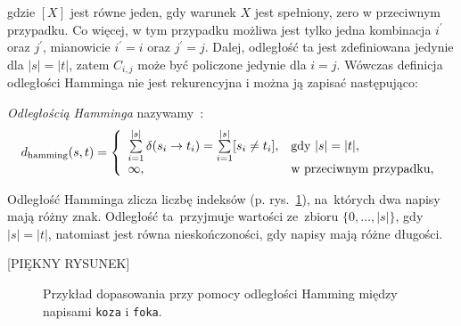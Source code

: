 \documentclass{praca1}
\begin{document}
gdzie $[X]$ jest równe jeden, gdy warunek $X$ jest spełniony, zero w przeciwnym przypadku. Co więcej, w tym przypadku możliwa jest tylko jedna kombinacja $i^\prime$ oraz $j^\prime$, mianowicie $i^\prime = i$ oraz $j^\prime = j$. Dalej, odległość ta jest zdefiniowana jedynie dla $|s| = |t|$, zatem $C_{i,j}$ może być policzone jedynie dla $i = j$. Wówczas definicja odległości Hamminga nie jest rekurencyjna i można ją zapisać następująco:


\begin{definition}
\emph{Odległością Hamminga} nazywamy~\cite{Hamming1950:errordetecting}:
$$
d_{\mathrm{hamming}}(s, t) = \left\{
\begin{array}{l l}     
    \sum\limits_{i=1}^{|s|}\delta(s_i \rightarrow t_i) = \sum\limits_{i=1}^{|s|}[s_i\neq t_i], & \text{gdy } |s| = |t|,\\
    \infty, & \text{w przeciwnym przypadku},
\end{array}\right.
$$
\end{definition}

Odległość Hamminga zlicza liczbę indeksów (p. rys.~\ref{rys:002}), na~których dwa napisy mają różny znak. Odległość ta~przyjmuje wartości ze~zbioru $\{0,\ldots,|s|\}$, gdy $|s|=|t|$, natomiast jest równa nieskończoności, gdy napisy mają różne długości.

[PIĘKNY RYSUNEK]


\begin{figure}[width=80pt]
\centering
{}
\cprotect\caption{Przykład dopasowania przy pomocy odległości Hamming między napisami \verb|koza| i \verb|foka|.}\label{rys:002}
\end{figure}
\end{document}
